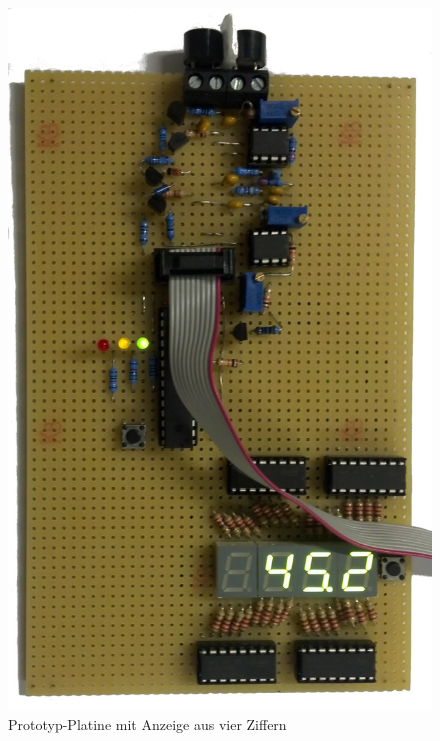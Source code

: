\begin{figure}[H]
	\centering
	\includegraphics[width=(0.6\textwidth)]{fotos/platine.jpg}
	\caption{Prototyp-Platine mit Anzeige aus vier Ziffern} \label{img:prototype}
\end{figure}

